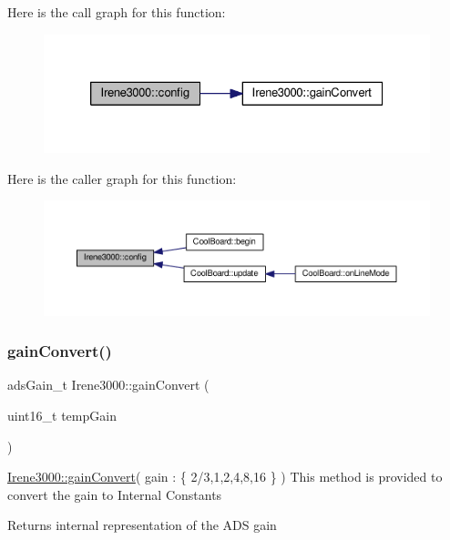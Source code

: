 Here is the call graph for this function\+:\nopagebreak
\begin{figure}[H]
\begin{center}
\leavevmode
\includegraphics[width=326pt]{classIrene3000_afed5c35e4b23963c157847ef27c11e9c_cgraph}
\end{center}
\end{figure}
Here is the caller graph for this function\+:\nopagebreak
\begin{figure}[H]
\begin{center}
\leavevmode
\includegraphics[width=350pt]{classIrene3000_afed5c35e4b23963c157847ef27c11e9c_icgraph}
\end{center}
\end{figure}
\mbox{\label{classIrene3000_abcad62d1201a59f8dd3ba87048002728}} 
\subsubsection{\texorpdfstring{gain\+Convert()}{gainConvert()}}
{\footnotesize\ttfamily ads\+Gain\+\_\+t Irene3000\+::gain\+Convert (\begin{DoxyParamCaption}\item[{uint16\+\_\+t}]{temp\+Gain }\end{DoxyParamCaption})}

\hyperlink{classIrene3000_abcad62d1201a59f8dd3ba87048002728}{Irene3000\+::gain\+Convert}( gain \+: \{ 2/3,1,2,4,8,16 \} ) This method is provided to convert the gain to Internal Constants

\begin{DoxyReturn}{Returns}
internal representation of the A\+DS gain 
\end{DoxyReturn}


